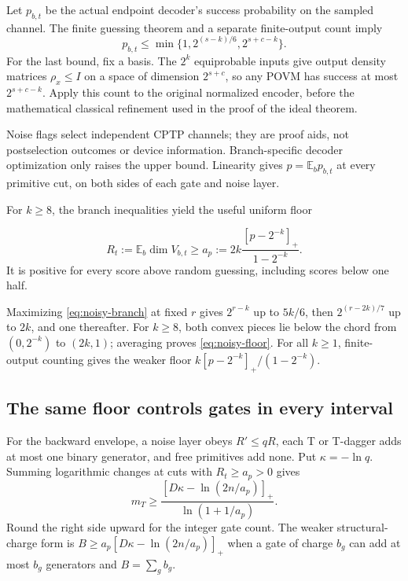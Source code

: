 \documentclass[11pt,a4paper]{article}
\newcommand{\E}{\mathbb E}
\begin{document}
Let $p_{b,t}$ be the actual endpoint decoder's success probability on the sampled channel. The finite guessing theorem and a separate finite-output count imply
\begin{equation}
p_{b,t}\le\min\{1,2^{(s-k)/6},2^{s+c-k}\}.
\label{eq:noisy-branch}
\end{equation}
For the last bound, fix a basis. The $2^k$ equiprobable inputs give output density matrices $\rho_x\le I$ on a space of dimension $2^{s+c}$, so any POVM has success at most $2^{s+c-k}$. Apply this count to the original normalized encoder, before the mathematical classical refinement used in the proof of the ideal theorem.

Noise flags select independent CPTP channels; they are proof aids, not postselection outcomes or device information. Branch-specific decoder optimization only raises the upper bound. Linearity gives $p=\E_b p_{b,t}$ at every primitive cut, on both sides of each gate and noise layer.

For $k\ge8$, the branch inequalities yield the useful uniform floor
\begin{keybox}
\begin{equation}
R_t:=\E_b\dim V_{b,t}\ge
a_p:=2k\frac{[p-2^{-k}]_+}{1-2^{-k}}.
\label{eq:noisy-floor}
\end{equation}
It is positive for every score above random guessing, including scores below one half.
\end{keybox}
Maximizing \eqref{eq:noisy-branch} at fixed $r$ gives $2^{r-k}$ up to $5k/6$, then $2^{(r-2k)/7}$ up to $2k$, and one thereafter. For $k\ge8$, both convex pieces lie below the chord from $(0,2^{-k})$ to $(2k,1)$; averaging proves \eqref{eq:noisy-floor}. For all $k\ge1$, finite-output counting gives the weaker floor $k[p-2^{-k}]_+/(1-2^{-k})$.

\subsection{The same floor controls gates in every interval}
For the backward envelope, a noise layer obeys $R'\le qR$, each T or T-dagger adds at most one binary generator, and free primitives add none. Put $\kappa=-\ln q$. Summing logarithmic changes at cuts with $R_t\ge a_p>0$ gives
\begin{equation}
m_T\ge
\frac{[D\kappa-\ln(2n/a_p)]_+}{\ln(1+1/a_p)}.
\label{eq:noisy-budget}
\end{equation}
Round the right side upward for the integer gate count. The weaker structural-charge form is $B\ge a_p[D\kappa-\ln(2n/a_p)]_+$ when a gate of charge $b_g$ can add at most $b_g$ generators and $B=\sum_gb_g$.
\end{document}
